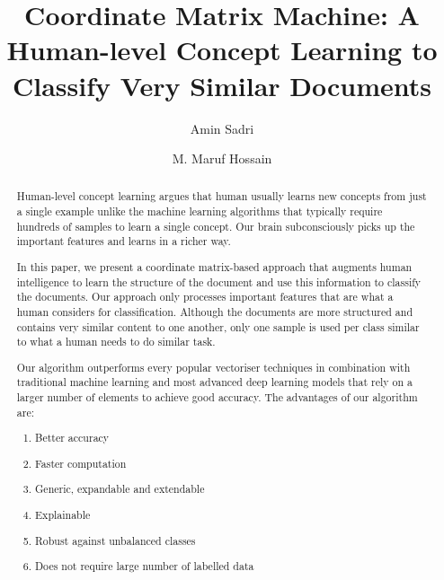 \documentclass[sigconf]{acmart}
\begin{document}
\title[Coordinate Matrix Machine]{Coordinate Matrix Machine: A Human-level Concept Learning to Classify Very Similar Documents}

\author{Amin Sadri}

\author{M. Maruf Hossain}

\renewcommand{\shortauthors}{Sadri and Hossain}

\begin{abstract}
Human-level concept learning argues that human usually learns new concepts from just a single example unlike the machine learning algorithms that typically require hundreds of samples to learn a single concept. Our brain subconsciously picks up the important features and learns in a richer way.

In this paper, we present a coordinate matrix-based approach that augments human intelligence to learn the structure of the document and use this information to classify the documents. Our approach only processes important features that are what a human considers for classification. Although the documents are more structured and contains very similar content to one another, only one sample is used per class similar to what a human needs to do similar task.

Our algorithm outperforms every popular vectoriser techniques in combination with traditional machine learning and most advanced deep learning models that rely on a larger number of elements to achieve good accuracy. The advantages of our algorithm are:
\begin{enumerate}
\item Better accuracy
\item Faster computation
\item Generic, expandable and extendable
\item Explainable
\item Robust against unbalanced classes
\item Does not require large number of labelled data
\end{enumerate}
\end{abstract}
\end{document}
